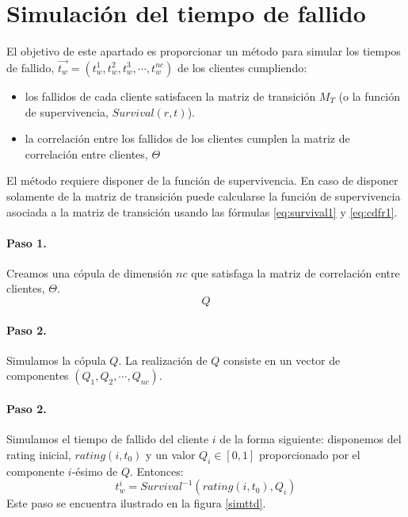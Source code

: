 
\section{Simulaci\'on del tiempo de fallido}
\label{res:mttd}

El objetivo de este apartado es proporcionar un m\'etodo para simular los
tiempos de fallido, $\vec{t_w} = (t_w^1,t_w^2,t_w^3,\cdots,t_w^{nc})$ de los
clientes cumpliendo:
\begin{itemize}
\item los fallidos de cada cliente satisfacen la matriz de transici\'on $M_T$
(o la funci\'on de supervivencia, $Survival(r,t)$).
\item la correlaci\'on entre los fallidos de los clientes cumplen la matriz
de correlaci\'on entre clientes, $\Theta$
\end{itemize}

El m\'etodo requiere disponer de la funci\'on de supervivencia. En caso
de disponer solamente de la matriz de transici\'on puede calcularse la funci\'on
de supervivencia asociada a la matriz de transici\'on usando las f\'ormulas
\ref{eq:survival1} y \ref{eq:cdfr1}.

\paragraph{Paso 1.} Creamos una c\'opula de dimensi\'on $nc$ que satisfaga la
matriz de correlaci\'on entre clientes, $\Theta$.
\begin{displaymath}
Q
\end{displaymath}

\paragraph{Paso 2.} Simulamos la c\'opula $Q$. La realizaci\'on de $Q$ consiste
en un vector de componentes $(Q_1, Q_2, \cdots, Q_{nc})$.

\paragraph{Paso 2.} Simulamos el tiempo de fallido del cliente $i$ de la forma siguiente:
disponemos del rating inicial, $rating(i,t_0)$ y un valor $Q_i \in [0,1]$ proporcionado
por el componente $i$-\'esimo de $Q$. Entonces:
\begin{displaymath}
t_w^i = Survival^{-1}(rating(i,t_0),Q_i)
\end{displaymath}
Este paso se encuentra ilustrado en la figura \ref{simttd}.

